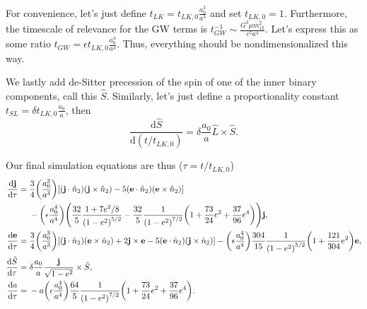 \documentclass[11pt,
        usenames, %
        dvipsnames %
    ]{article}
\newcommand*{\rd}[2]{\frac{\mathrm{d}#1}{\mathrm{d}#2}}
\newcommand*{\bm}[1]{\boldsymbol{\mathbf{#1}}}
\DeclarePairedDelimiter\p{\lparen}{\rparen}
\DeclarePairedDelimiter\s{\lbrack}{\rbrack}
\begin{document}
For convenience, let's just define $t_{LK} = t_{LK,0} \frac{a_0^3}{a^3}$
and set $t_{LK, 0} = 1$. Furthermore, the timescale of relevance for the GW
terms is $t_{GW}^{-1} \sim \frac{G^3 \mu m_{12}^2}{c^5a^4}$. Let's express this
as some ratio $t_{GW} = \epsilon t_{LK, 0}\frac{a_0^4}{a^4}$. Thus, everything
should be nondimensionalized this way.

We lastly add de-Sitter precession of the spin of one of the inner binary
components, call this $\hat{S}$. Similarly, let's just define a proportionality
constant $t_{SL} = \delta t_{LK, 0}\frac{a_0}{a}$, then
\begin{equation}
    \rd{\hat{S}}{(t / t_{LK, 0})} = \delta \frac{a_0}{a} \hat{L} \times \hat{S}.
\end{equation}

Our final simulation equations are thus ($\tau = t / t_{LK, 0}$)
\begin{align}
    \rd{\bm{j}}{\tau} ={}& \frac{3}{4}\p*{\frac{a_0^3}{a^3}} \s*{
        \p*{\bm{j} \cdot \hat{n}_2} \p*{\bm{j} \times \hat{n}_2}
        - 5\p*{\bm{e} \cdot \hat{n}_2}\p*{\bm{e} \times \hat{n}_2}
        }\nonumber\\
        &- \p*{\epsilon \frac{a_0^4}{a^4}}\p*{
            \frac{32}{5}
                \frac{1 + 7e^2/8}{\p*{1 - e^2}^{5/2}}
            - \frac{32}{5} \frac{1}{\p*{1 - e^2}^{7/2}}\p*{1 + \frac{73}{24}e^2
                    + \frac{37}{96}e^4}
            }\bm{j},\\
    \rd{\bm{e}}{\tau} ={}&
        \frac{3}{4}\p*{\frac{a_0^3}{a^3}} \s*{
            \p*{\bm{j} \cdot \hat{n}_2} \p*{\bm{e} \times \hat{n}_2}
            + 2\bm{j} \times \bm{e}
            - 5\p*{\bm{e} \cdot \hat{n}_2}\p*{\bm{j} \times \hat{n}_2}
            }
        -
            \p*{\epsilon\frac{a_0^4}{a^4}}
            \frac{304}{15}
            \frac{1}{\p*{1 - e^2}^{5/2}}
            \p*{1 + \frac{121}{304} e^2}\bm{e},\\
    \rd{\hat{S}}{\tau} ={}& \delta \frac{a_0}{a}
        \frac{\bm{j}}{\sqrt{1 - e^2}} \times \hat{S},\\
    \rd{a}{\tau} ={}& -a\p*{\epsilon\frac{a_0^4}{a^4}}
        \frac{64}{5} \frac{1}{\p*{1 - e^2}^{7/2}}\p*{1 + \frac{73}{24}e^2
            + \frac{37}{96}e^4}.
\end{align}
\end{document}
